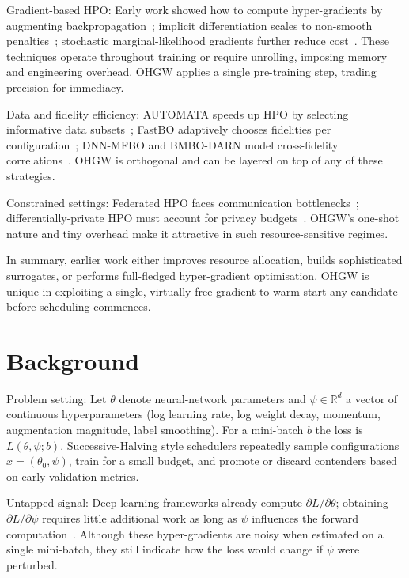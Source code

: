 \documentclass{article}
\begin{document}
Gradient-based HPO\@: Early work showed how to compute hyper-gradients by augmenting backpropagation~\cite{chandra-2019-gradient}; implicit differentiation scales to non-smooth penalties~\cite{bertrand-2020-implicit}; stochastic marginal-likelihood gradients further reduce cost~\cite{immer-2023-stochastic}. These techniques operate throughout training or require unrolling, imposing memory and engineering overhead. OHGW applies a single pre-training step, trading precision for immediacy.

Data and fidelity efficiency: AUTOMATA speeds up HPO by selecting informative data subsets~\cite{killamsetty-2022-automata}; FastBO adaptively chooses fidelities per configuration~\cite{jiang-2024-efficient}; DNN-MFBO and BMBO-DARN model cross-fidelity correlations~\cite{li-2020-multi,li-2021-batch}. OHGW is orthogonal and can be layered on top of any of these strategies.

Constrained settings: Federated HPO faces communication bottlenecks~\cite{khodak-2021-federated}; differentially-private HPO must account for privacy budgets~\cite{panda-2022-new,wang-2023-hypo}. OHGW's one-shot nature and tiny overhead make it attractive in such resource-sensitive regimes.

In summary, earlier work either improves resource allocation, builds sophisticated surrogates, or performs full-fledged hyper-gradient optimisation. OHGW is unique in exploiting a single, virtually free gradient to warm-start any candidate before scheduling commences.

\section{Background}
Problem setting: Let \(\theta\) denote neural-network parameters and \(\psi\in\mathbb{R}^d\) a vector of continuous hyperparameters (log learning rate, log weight decay, momentum, augmentation magnitude, label smoothing). For a mini-batch \(b\) the loss is \(L(\theta,\psi; b)\). Successive-Halving style schedulers repeatedly sample configurations \(x=(\theta_0,\psi)\), train for a small budget, and promote or discard contenders based on early validation metrics.

Untapped signal: Deep-learning frameworks already compute \(\partial L/\partial \theta\); obtaining \(\partial L/\partial \psi\) requires little additional work as long as \(\psi\) influences the forward computation~\cite{chandra-2019-gradient}. Although these hyper-gradients are noisy when estimated on a single mini-batch, they still indicate how the loss would change if \(\psi\) were perturbed.
\end{document}
